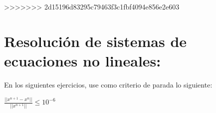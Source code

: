 \documentclass{udparticle}
\begin{document}
\begin{enumerate}
>>>>>>> 2d15196d83295c79463f3c1fbf4094e856e2e603
\end{enumerate}
\newpage
\section{Resolución de sistemas de ecuaciones no lineales:}
    
        
        En los siguientes ejercicios, use como criterio de parada lo siguiente:
        \begin{center}
            $ \frac{|| x^{n+1} - x^{n} ||}{|| x^{n+1} ||} \leq 10^{-6} $  
        \end{center}
\end{document}
